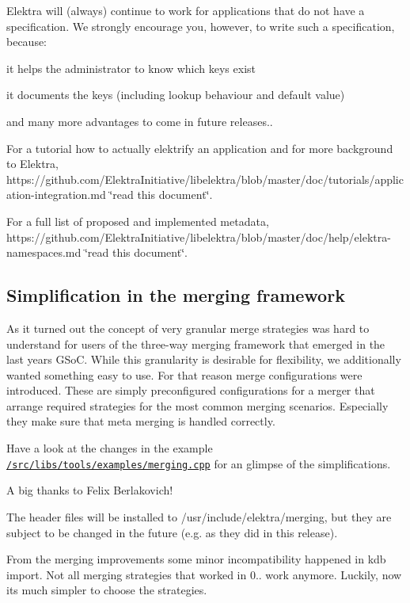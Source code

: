 Elektra will (always) continue to work for applications that do not have a specification. We strongly encourage you, however, to write such a specification, because\+:


\begin{DoxyItemize}
\item it helps the administrator to know which keys exist
\item it documents the keys (including lookup behaviour and default value)
\item and many more advantages to come in future releases..
\end{DoxyItemize}

For a tutorial how to actually elektrify an application and for more background to Elektra, https\+://github.com/\+Elektra\+Initiative/libelektra/blob/master/doc/tutorials/application-\/integration.\+md \char`\"{}read this document\char`\"{}.

For a full list of proposed and implemented metadata, https\+://github.com/\+Elektra\+Initiative/libelektra/blob/master/doc/help/elektra-\/namespaces.\+md \char`\"{}read this document\char`\"{}.

\subsection*{Simplification in the merging framework}

As it turned out the concept of very granular merge strategies was hard to understand for users of the three-\/way merging framework that emerged in the last year\textquotesingle{}s G\+SoC. While this granularity is desirable for flexibility, we additionally wanted something easy to use. For that reason merge configurations were introduced. These are simply preconfigured configurations for a merger that arrange required strategies for the most common merging scenarios. Especially they make sure that meta merging is handled correctly.

Have a look at the changes in the example \href{https://github.com/ElektraInitiative/libelektra/blob/master/src/libs/tools/examples/merging.cpp}{\tt /src/libs/tools/examples/merging.cpp} for an glimpse of the simplifications.

A big thanks to Felix Berlakovich!

The header files will be installed to /usr/include/elektra/merging, but they are subject to be changed in the future (e.\+g. as they did in this release).

From the merging improvements some minor incompatibility happened in {\ttfamily kdb import}. Not all merging strategies that worked in 0.. work anymore. Luckily, now its much simpler to choose the strategies.

